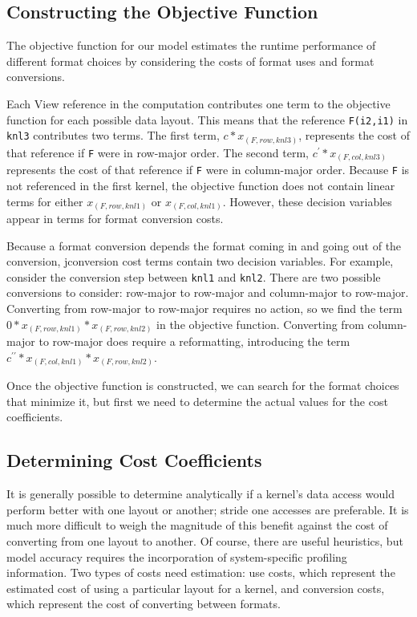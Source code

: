 \subsection{Constructing the Objective Function}

The objective function for our model estimates the runtime performance of different format choices by considering the costs of format uses and format conversions.

Each View reference in the computation contributes one term to the objective function for each possible data layout. This means that the reference \verb.F(i2,i1). in \verb.knl3.  contributes two terms.
The first term,  $c * x_{(F,row,knl3)}$,  represents the cost of that reference if \verb.F. were in row-major order. 
The second term, $c^\prime * x_{(F,col,knl3)}$  represents the cost of that reference if \verb.F. were in column-major order.
Because \verb.F. is not referenced in the first kernel, the objective function does not contain linear terms for either $x_{(F,row,knl1)}$ or $x_{(F,col,knl1)}$.
However, these decision variables appear in terms for format conversion costs.

Because a format conversion depends the format coming in and going out of the conversion, jconversion cost terms contain two decision variables.
For example, consider the conversion step between \verb.knl1. and \verb.knl2..
There are two possible conversions to consider: row-major to row-major and column-major to row-major. 
Converting from row-major to row-major requires no action, so we  find the term $0 * x_{(F,row,knl1)} * x_{(F,row,knl2)}$ in the objective function.
Converting from column-major to row-major does require a reformatting, introducing the term $c^{\prime\prime} * x_{(F,col,knl1)} * x_{(F,row,knl2)}$.

Once the objective function is constructed, we can search for the format choices that minimize it, but first we need to determine the actual values for the cost coefficients.

\subsection{Determining Cost Coefficients}

It is generally possible to determine analytically if a kernel's data access would perform better with one layout or another; stride one accesses are preferable.
It is much more difficult to weigh the magnitude of this benefit against the cost of converting from one layout to another. 
Of course, there are useful heuristics, but model accuracy requires the incorporation of system-specific profiling information. 
Two types of costs need estimation: use costs, which represent the estimated cost of using a particular layout for a kernel, and conversion costs, which represent the cost of converting between formats.

